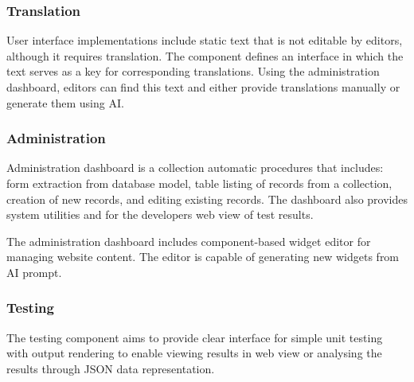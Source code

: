 \subsubsection*{Translation}
User interface implementations include static text that is not editable by editors, although it requires translation.
The component defines an interface in which the text serves as a key for corresponding translations.
Using the administration dashboard, editors can find this text and either provide translations manually or generate them using AI\@.

\subsubsection*{Administration}
Administration dashboard is a collection automatic procedures that includes: form extraction from database model,
table listing of records from a collection, creation of new records, and editing existing records.
The dashboard also provides system utilities and for the developers web view of test results.

The administration dashboard includes component-based widget editor for managing website content.
The editor is capable of generating new widgets from AI prompt.

\subsubsection*{Testing}
The testing component aims to provide clear interface for simple unit testing with output rendering to enable viewing results
in web view or analysing the results through JSON data representation.
